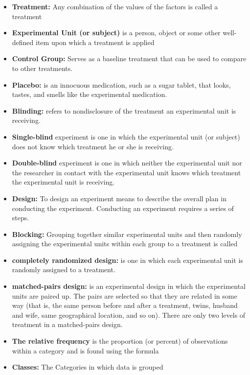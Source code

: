 \documentclass{report}
\begin{document}
\begin{itemize}
            \item \textbf{Treatment:} Any combination of the values of the factors is called a treatment
            \item \textbf{Experimental Unit (or subject)} is a person, object or some other well-defined item upon which a treatment is applied
            \item \textbf{Control Group:} Serves as a baseline treatment that can be used to compare to other treatments.
            \item \textbf{Placebo:} is an innocuous medication, such as a sugar tablet, that looks, tastes, and smells like the experimental medication.
            \item \textbf{Blinding:} refers to nondisclosure of the treatment an experimental unit is receiving.
            \item \textbf{Single-blind} experiment is one in which the experimental unit (or subject) does not know which treatment he or she is receiving.
            \item \textbf{Double-blind} experiment is one in which neither the experimental unit nor the researcher in contact with the experimental unit knows which treatment the experimental unit is receiving.
            \item \textbf{Design:} To design an experiment means to describe the overall plan in conducting the experiment. Conducting an experiment requires a series of steps.
            \item \textbf{Blocking:} Grouping together similar experimental units and then randomly assigning the experimental units within each group to a treatment is called 
            \item \textbf{completely randomized design:} is one in which each experimental unit is randomly assigned to a treatment.
            \item \textbf{matched-pairs design:} is an experimental design in which the experimental units are paired up. The pairs are selected so that they are related in some way (that is, the same person before and after a treatment, twins, husband and wife, same geographical location, and so on). There are only two levels of treatment in a matched-pairs design.
            \item \textbf{The relative frequency} is the proportion (or percent) of observations within a category and is found using the formula
            \item \textbf{Classes: } The Categories in which data is grouped

\end{itemize}
\end{document}

